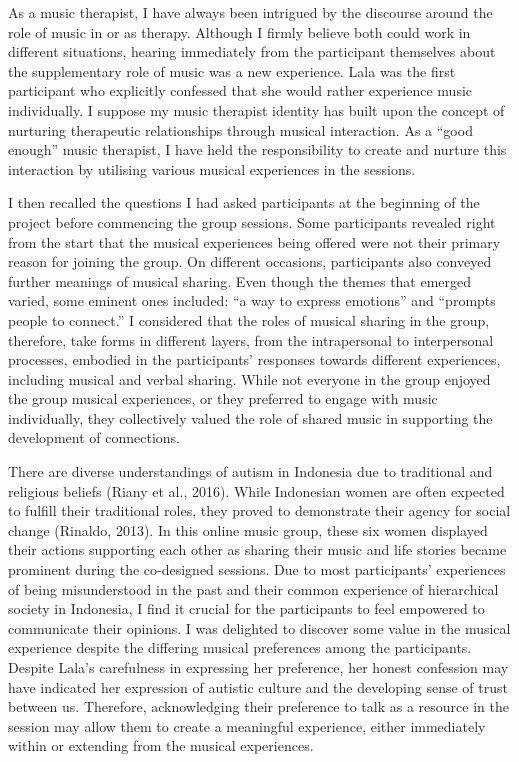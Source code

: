 \documentclass[authordate, empirical, issue]{jote-new-article}
\begin{document}
As a music therapist, I have always been intrigued by the discourse around the role of music in or as therapy. Although I firmly believe both could work in different situations, hearing immediately from the participant themselves about the supplementary role of music was a new experience. Lala was the first participant who explicitly confessed that she would rather experience music individually. I suppose my music therapist identity has built upon the concept of nurturing therapeutic relationships through musical interaction. As a “good enough” music therapist, I have held the responsibility to create and nurture this interaction by utilising various musical experiences in the sessions.



I then recalled the questions I had asked participants at the beginning of the project before commencing the group sessions. Some participants revealed right from the start that the musical experiences being offered were not their primary reason for joining the group. On different occasions, participants also conveyed further meanings of musical sharing. Even though the themes that emerged varied, some eminent ones included: “a way to express emotions” and “prompts people to connect.” I considered that the roles of musical sharing in the group, therefore, take forms in different layers, from the intrapersonal to interpersonal processes, embodied in the participants' responses towards different experiences, including musical and verbal sharing. While not everyone in the group enjoyed the group musical experiences, or they preferred to engage with music individually, they collectively valued the role of shared music in supporting the development of connections.



There are diverse understandings of autism in Indonesia due to traditional and religious beliefs (Riany et al., 2016). While Indonesian women are often expected to fulfill their traditional roles, they proved to demonstrate their agency for social change (Rinaldo, 2013). In this online music group, these six women displayed their actions supporting each other as sharing their music and life stories became prominent during the co-designed sessions. Due to most participants' experiences of being misunderstood in the past and their common experience of hierarchical society in Indonesia, I find it crucial for the participants to feel empowered to communicate their opinions. I was delighted to discover some value in the musical experience despite the differing musical preferences among the participants. Despite Lala's carefulness in expressing her preference, her honest confession may have indicated her expression of autistic culture and the developing sense of trust between us. Therefore, acknowledging their preference to talk as a resource in the session may allow them to create a meaningful experience, either immediately within or extending from the musical experiences.
\end{document}
